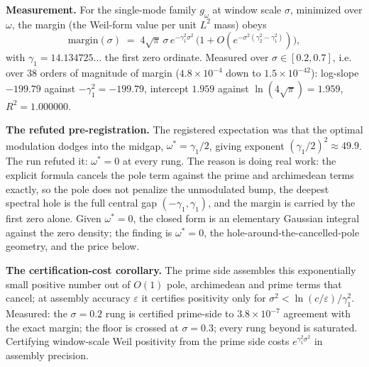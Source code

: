 \documentclass[10pt]{article}
\begin{document}
\textbf{Measurement.} For the single-mode family $g_\omega$ at window scale $\sigma$, minimized over $\omega$, the margin (the Weil-form value per unit $L^2$ mass) obeys
\[
\mathrm{margin}(\sigma) \;=\; 4\sqrt{\pi}\,\sigma\, e^{-\gamma_1^2 \sigma^2}\,\big(1 + O(e^{-\sigma^2(\gamma_2^2 - \gamma_1^2)})\big),
\]
with $\gamma_1 = 14.134725\ldots$ the first zero ordinate. Measured over $\sigma \in [0.2, 0.7]$, i.e. over 38 orders of magnitude of margin ($4.8 \times 10^{-4}$ down to $1.5 \times 10^{-42}$): log-slope $-199.79$ against $-\gamma_1^2 = -199.79$, intercept $1.959$ against $\ln(4\sqrt\pi) = 1.959$, $R^2 = 1.000000$.

\textbf{The refuted pre-registration.} The registered expectation was that the optimal modulation dodges into the midgap, $\omega^* = \gamma_1/2$, giving exponent $(\gamma_1/2)^2 \approx 49.9$. The run refuted it: $\omega^* = 0$ at every rung. The reason is doing real work: the explicit formula cancels the pole term against the prime and archimedean terms exactly, so the pole does not penalize the unmodulated bump, the deepest spectral hole is the full central gap $(-\gamma_1, \gamma_1)$, and the margin is carried by the first zero alone. Given $\omega^* = 0$, the closed form is an elementary Gaussian integral against the zero density; the finding is $\omega^* = 0$, the hole-around-the-cancelled-pole geometry, and the price below.

\textbf{The certification-cost corollary.} The prime side assembles this exponentially small positive number out of $O(1)$ pole, archimedean and prime terms that cancel; at assembly accuracy $\varepsilon$ it certifies positivity only for $\sigma^2 < \ln(c/\varepsilon)/\gamma_1^2$. Measured: the $\sigma = 0.2$ rung is certified prime-side to $3.8 \times 10^{-7}$ agreement with the exact margin; the floor is crossed at $\sigma = 0.3$; every rung beyond is saturated. Certifying window-scale Weil positivity from the prime side costs $e^{\gamma_1^2 \sigma^2}$ in assembly precision.
\end{document}
